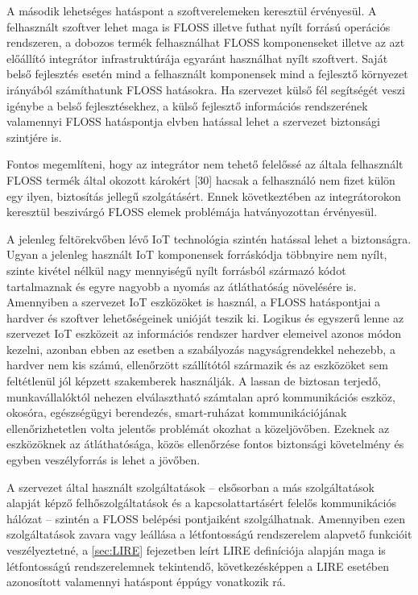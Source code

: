 \documentclass[12pt,magyar,a4paper,oneside]{scrreprt}
\begin{document}
A második lehetséges hatáspont a szoftverelemeken keresztül érvényesül.
A felhasznált szoftver lehet maga is FLOSS illetve futhat nyílt forrású
operációs rendszeren, a dobozos termék felhasználhat FLOSS komponenseket
illetve az azt előállító integrátor infrastruktúrája egyaránt használhat
nyílt szoftvert. Saját belső fejlesztés esetén mind a felhasznált
komponensek mind a fejlesztő környezet irányából számíthatunk FLOSS
hatásokra. Ha szervezet külső fél segítségét veszi igénybe a belső
fejlesztésekhez, a külső fejlesztő információs rendszerének valamennyi
FLOSS hatáspontja elvben hatással lehet a szervezet biztonsági szintjére
is.

Fontos megemlíteni, hogy az integrátor nem tehető felelőssé az általa
felhasznált FLOSS termék által okozott károkért {[}30{]} hacsak a
felhasználó nem fizet külön egy ilyen, biztosítás jellegű szolgátásért.
Ennek következtében az integrátorokon keresztül beszivárgó FLOSS elemek
problémája hatványozottan érvényesül.

A jelenleg feltörekvőben lévő IoT technológia szintén hatással lehet a
biztonságra. Ugyan a jelenleg használt IoT komponensek forráskódja
többnyire nem nyílt, szinte kivétel nélkül nagy mennyiségű nyílt
forrásból származó kódot tartalmaznak és egyre nagyobb a nyomás az
átláthatóság növelésére is. Amennyiben a szervezet IoT eszközöket is
használ, a FLOSS hatáspontjai a hardver és szoftver lehetőségeinek
unióját teszik ki. Logikus és egyszerű lenne az szervezet IoT eszközeit
az információs rendszer hardver elemeivel azonos módon kezelni, azonban
ebben az esetben a szabályozás nagyságrendekkel nehezebb, a hardver nem
kis számú, ellenőrzött szállítótól származik és az eszközöket sem
feltétlenül jól képzett szakemberek használják. A lassan de biztosan
terjedő, munkavállalóktól nehezen elválasztható számtalan apró
kommunikációs eszköz, okosóra, egészségügyi berendezés, smart-ruházat
kommunikációjának ellenőrizhetetlen volta jelentős problémát okozhat a
közeljövőben. Ezeknek az eszközöknek az átláthatósága, közös ellenőrzése
fontos biztonsági követelmény és egyben veszélyforrás is lehet a
jövőben.

A szervezet által használt szolgáltatások -- elsősorban a más
szolgáltatások alapját képző felhőszolgáltatások és a kapcsolattartásért
felelős kommunikációs hálózat -- szintén a FLOSS belépési pontjaiként
szolgálhatnak. Amennyiben ezen szolgáltatások zavara vagy leállása a
létfontosságú rendszerelem alapvető funkcióit veszélyeztetné, a
\ref{sec:LIRE} fejezetben leírt LIRE definíciója alapján maga is
létfontosságú rendszerelemnek tekintendő, következésképpen a LIRE
esetében azonosított valamennyi hatáspont éppúgy vonatkozik rá.
\end{document}
